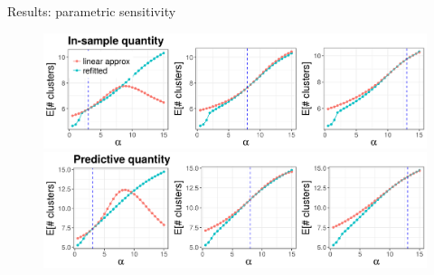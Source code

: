 \documentclass[10pt]{beamer}\usepackage[]{graphicx}\usepackage[]{color}
\newenvironment{knitrout}{}{} %
\begin{document}
\begin{frame}{Results: parametric sensitivity}

\begin{figure}
\centering
\begin{knitrout}
\color{fgcolor}

{\centering \includegraphics[width=0.98\linewidth,height=0.294\linewidth]{figure/param_sens_plot_thresh_0-1} 

}



\end{knitrout}
\begin{knitrout}
\color{fgcolor}

{\centering \includegraphics[width=0.98\linewidth,height=0.294\linewidth]{figure/param_sens_plot_thresh_0b-1} 

}



\end{knitrout}
\end{figure}

\end{frame}
\end{document}
